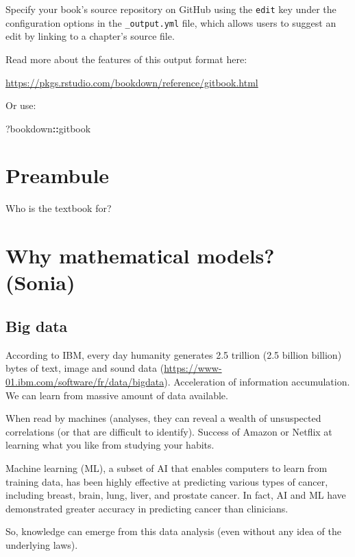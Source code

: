 \documentclass[
]{book}
\newenvironment{Shaded}{\begin{snugshade}}{\end{snugshade}}
\newcommand{\NormalTok}[1]{#1}
\newcommand{\SpecialCharTok}[1]{\textcolor[rgb]{0.81,0.36,0.00}{\textbf{#1}}}
\theoremstyle{definition}
\theoremstyle{definition}
\theoremstyle{definition}
\theoremstyle{definition}
\theoremstyle{remark}
\begin{document}
Specify your book's source repository on GitHub using the \texttt{edit} key under the configuration options in the \texttt{\_output.yml} file, which allows users to suggest an edit by linking to a chapter's source file.

Read more about the features of this output format here:

\url{https://pkgs.rstudio.com/bookdown/reference/gitbook.html}

Or use:

\begin{Shaded}
\begin{Highlighting}[]
\NormalTok{?bookdown}\SpecialCharTok{::}\NormalTok{gitbook}
\end{Highlighting}
\end{Shaded}

\chapter{Preambule}\label{preambule}

Who is the textbook for?

\chapter{Why mathematical models? (Sonia)}\label{why-mathematical-models-sonia}

\section{Big data}\label{big-data}

According to IBM, every day humanity generates 2.5 trillion (2.5 billion billion) bytes of text, image and sound data (\url{https://www-01.ibm.com/software/fr/data/bigdata}). Acceleration of information accumulation. We can learn from massive amount of data available.

When read by machines (analyses, they can reveal a wealth of unsuspected correlations (or that are difficult to identify). Success of Amazon or Netflix at learning what you like from studying your habits.

Machine learning (ML), a subset of AI that enables computers to learn from training data, has been highly effective at predicting various types of cancer, including breast, brain, lung, liver, and prostate cancer. In fact, AI and ML have demonstrated greater accuracy in predicting cancer than clinicians.

So, knowledge can emerge from this data analysis (even without any idea of the underlying laws).
\end{document}

